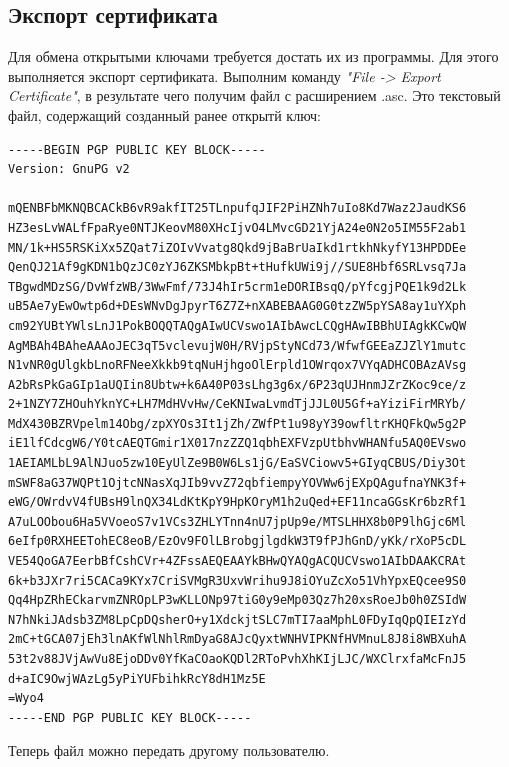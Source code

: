 \documentclass[10pt,a4paper]{report}
\begin{document}
\subsection{Экспорт сертификата}
Для обмена открытыми ключами требуется достать их из программы. Для этого выполняется экспорт сертификата.
Выполним команду \textit{"File ->  Export Certificate"}, в результате чего получим файл с расширением .asc. Это текстовый файл, содержащий созданный ранее открытй ключ:\\

\begin{verbatim}
-----BEGIN PGP PUBLIC KEY BLOCK-----
Version: GnuPG v2

mQENBFbMKNQBCACkB6vR9akfIT25TLnpufqJIF2PiHZNh7uIo8Kd7Waz2JaudKS6
HZ3esLvWALfFpaRye0NTJKeovM80XHcIjvO4LMvcGD21YjA24e0N2o5IM55F2ab1
MN/1k+HS5RSKiXx5ZQat7iZOIvVvatg8Qkd9jBaBrUaIkd1rtkhNkyfY13HPDDEe
QenQJ21Af9gKDN1bQzJC0zYJ6ZKSMbkpBt+tHufkUWi9j//SUE8Hbf6SRLvsq7Ja
TBgwdMDzSG/DvWfzWB/3WwFmf/73J4hIr5crm1eDORIBsqQ/pYfcgjPQE1k9d2Lk
uB5Ae7yEwOwtp6d+DEsWNvDgJpyrT6Z7Z+nXABEBAAG0G0tzZW5pYSA8ay1uYXph
cm92YUBtYWlsLnJ1PokBOQQTAQgAIwUCVswo1AIbAwcLCQgHAwIBBhUIAgkKCwQW
AgMBAh4BAheAAAoJEC3qT5vclevujW0H/RVjpStyNCd73/WfwfGEEaZJZlY1mutc
N1vNR0gUlgkbLnoRFNeeXkkb9tqNuHjhgoOlErpld1OWrqox7VYqADHCOBAzAVsg
A2bRsPkGaGIp1aUQIin8Ubtw+k6A40P03sLhg3g6x/6P23qUJHnmJZrZKoc9ce/z
2+1NZY7ZHOuhYknYC+LH7MdHVvHw/CeKNIwaLvmdTjJJL0U5Gf+aYiziFirMRYb/
MdX430BZRVpelm14Obg/zpXYOs3It1jZh/ZWfPt1u98yY39owfltrKHQFkQw5g2P
iE1lfCdcgW6/Y0tcAEQTGmir1X017nzZZQ1qbhEXFVzpUtbhvWHANfu5AQ0EVswo
1AEIAMLbL9AlNJuo5zw10EyUlZe9B0W6Ls1jG/EaSVCiowv5+GIyqCBUS/Diy3Ot
mSWF8aG37WQPt1OjtcNNasXqJIb9vvZ72qbfiempyYOVWw6jEXpQAgufnaYNK3f+
eWG/OWrdvV4fUBsH9lnQX34LdKtKpY9HpKOryM1h2uQed+EF11ncaGGsKr6bzRf1
A7uLOObou6Ha5VVoeoS7v1VCs3ZHLYTnn4nU7jpUp9e/MTSLHHX8b0P9lhGjc6Ml
6eIfp0RXHEETohEC8eoB/EzOv9FOlLBrobgjlgdkW3T9fPJhGnD/yKk/rXoP5cDL
VE54QoGA7EerbBfCshCVr+4ZFssAEQEAAYkBHwQYAQgACQUCVswo1AIbDAAKCRAt
6k+b3JXr7ri5CACa9KYx7CriSVMgR3UxvWrihu9J8iOYuZcXo51VhYpxEQcee9S0
Qq4HpZRhECkarvmZNROpLP3wKLLONp97tiG0y9eMp03Qz7h20xsRoeJb0h0ZSIdW
N7hNkiJAdsb3ZM8LpCpDQsherO+y1XdckjtSLC7mTI7aaMphL0FDyIqQpQIEIzYd
2mC+tGCA07jEh3lnAKfWlNhlRmDyaG8AJcQyxtWNHVIPKNfHVMnuL8J8i8WBXuhA
53t2v88JVjAwVu8EjoDDv0YfKaCOaoKQDl2RToPvhXhKIjLJC/WXClrxfaMcFnJ5
d+aIC9OwjWAzLg5yPiYUFbihkRcY8dH1Mz5E
=Wyo4
-----END PGP PUBLIC KEY BLOCK-----
\end{verbatim}
Теперь файл можно передать другому пользователю.
\end{document}
